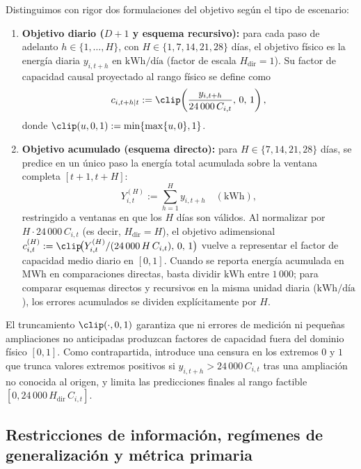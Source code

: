Distinguimos con rigor dos formulaciones del objetivo según el tipo de escenario:
\begin{enumerate}
    \item \textbf{Objetivo diario ($D+1$ y esquema recursivo):} para cada paso de adelanto $h \in \{1,\dots,H\}$, con $H \in \{1,7,14,21,28\}$ días, el objetivo físico es la energía diaria $y_{i,t+h}$ en $\text{kWh/día}$ (factor de escala $H_{\mathrm{dir}} = 1$). Su factor de capacidad causal proyectado al rango físico se define como
    \begin{equation}
    c_{i,t+h \mid t} := \clip\!\left(\frac{y_{i,t+h}}{24\,000\,C_{i,t}},\, 0,\, 1\right),
    \label{eq:cf_diario}
    \end{equation}
    donde $\clip(u,0,1) := \min\{\max\{u,0\},1\}$.
    \item \textbf{Objetivo acumulado (esquema directo):} para $H \in \{7,14,21,28\}$ días, se predice en un único paso la energía total acumulada sobre la ventana completa $[t+1, t+H]$:
    \begin{equation}
    Y_{i,t}^{(H)} := \sum_{h=1}^{H} y_{i,t+h} \quad (\text{kWh}),
    \label{eq:y_directo}
    \end{equation}
    restringido a ventanas en que los $H$ días son válidos. Al normalizar por $H \cdot 24\,000\,C_{i,t}$ (es decir, $H_{\mathrm{dir}} = H$), el objetivo adimensional $c_{i,t}^{(H)} := \clip\!\big(Y_{i,t}^{(H)} / (24\,000\,H\,C_{i,t}),\, 0,\, 1\big)$ vuelve a representar el factor de capacidad medio diario en $[0,1]$. Cuando se reporta energía acumulada en MWh en comparaciones directas, basta dividir $\text{kWh}$ entre $1\,000$; para comparar esquemas directos y recursivos en la misma unidad diaria ($\text{kWh/día}$), los errores acumulados se dividen explícitamente por $H$.
\end{enumerate}

El truncamiento $\clip(\cdot,0,1)$ garantiza que ni errores de medición ni pequeñas ampliaciones no anticipadas produzcan factores de capacidad fuera del dominio físico $[0,1]$. Como contrapartida, introduce una censura en los extremos $0$ y $1$ que trunca valores extremos positivos si $y_{i,t+h} > 24\,000\,C_{i,t}$ tras una ampliación no conocida al origen, y limita las predicciones finales al rango factible $[0, 24\,000\,H_{\mathrm{dir}}\,C_{i,t}]$.

\subsection{Restricciones de información, regímenes de generalización y métrica primaria}

